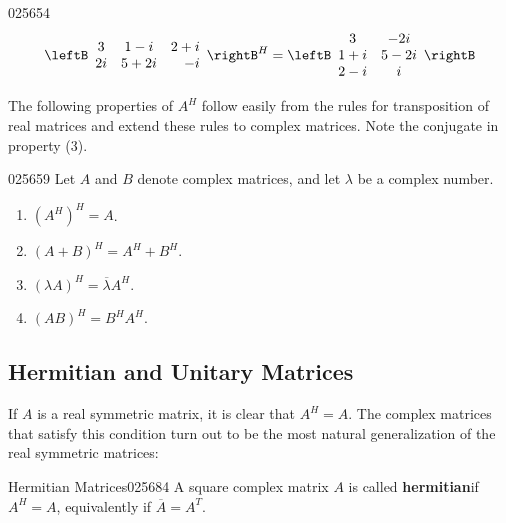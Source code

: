 \begin{example}{}{025654}
\begin{equation*}
\leftB \begin{array}{ccr}
3 & 1 - i & 2 + i \\
2i & 5 + 2i & -i
\end{array}\rightB^H = \leftB \begin{array}{cc}
3 & -2i \\
1 + i & 5 - 2i \\
2 - i & i
\end{array}\rightB
\end{equation*}
\end{example}

The following properties of $A^{H}$ follow easily from the rules for transposition of real matrices and extend these rules to complex matrices. Note the conjugate in property (3).


\begin{theorem}{}{025659}
Let $A$ and $B$ denote complex matrices, and let $\lambda$ be a complex number.


\begin{enumerate}
\item $(A^{H})^{H} = A$.

\item $(A + B)^{H} = A^{H} + B^{H}$.

\item $(\lambda A)^H = \overline{\lambda}A^H$.

\item $(AB)^{H} = B^{H}A^{H}$.

\end{enumerate}
\end{theorem}

\subsection*{Hermitian and Unitary Matrices}


If $A$ is a real symmetric matrix, it is clear that $A^{H} = A$. The complex matrices that satisfy this condition turn out to be the 
most natural generalization of the real symmetric matrices:


\begin{definition}{Hermitian Matrices}{025684}
A square complex matrix $A$ is called \textbf{hermitian}\footnotemark if $A^{H} = A$, equivalently if $\overline{A} = A^T$.
\end{definition}

